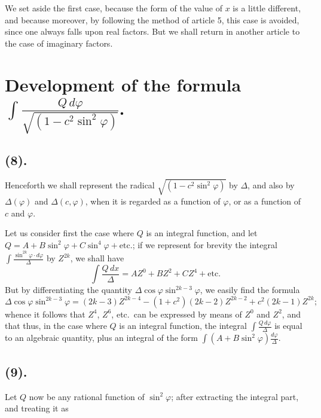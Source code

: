 \documentclass{article}
\begin{document}
We set aside the first case, because the form of the value of $x$ is a little different, and because moreover, by following the method of article 5, this case is avoided, since one always falls upon real factors. But we shall return in another article to the case of imaginary factors.

\section*{Development of the formula $\displaystyle\int\frac{Q\,d\varphi}{\sqrt{(1-c^{2}\sin^{2}\varphi)}}$.}

\subsection*{(8).}

Henceforth we shall represent the radical $\sqrt{(1-c^{2}\sin^{2}\varphi)}$ by $\Delta$, and also by $\Delta(\varphi)$ and $\Delta(c,\varphi)$, when it is regarded as a function of $\varphi$, or as a function of $c$ and $\varphi$.

Let us consider first the case where $Q$ is an integral function, and let $Q=A+B\sin^{2}\varphi+C\sin^{4}\varphi+\text{etc.}$; if we represent for brevity the integral $\displaystyle\int\frac{\sin^{2k}\varphi\cdot d\varphi}{\Delta}$ by $Z^{2k}$, we shall have
\[ \int\frac{Q\,dx}{\Delta}=AZ^{0}+BZ^{2}+CZ^{4}+\text{etc.} \]
But by differentiating the quantity $\Delta\cos\varphi\sin^{2k-3}\varphi$, we easily find the formula
\[ \Delta\cos\varphi\sin^{2k-3}\varphi=(2k-3)Z^{2k-4}-(1+c^{2})(2k-2)Z^{2k-2}+c^{2}(2k-1)Z^{2k}; \]
whence it follows that $Z^{4}$, $Z^{6}$, etc.\ can be expressed by means of $Z^{0}$ and $Z^{2}$, and that thus, in the case where $Q$ is an integral function, the integral $\displaystyle\int\frac{Q\,d\varphi}{\Delta}$ is equal to an algebraic quantity, plus an integral of the form $\displaystyle\int(A+B\sin^{2}\varphi)\frac{d\varphi}{\Delta}$.

\subsection*{(9).}

Let $Q$ now be any rational function of $\sin^{2}\varphi$; after extracting the integral part, and treating it as
\end{document}
